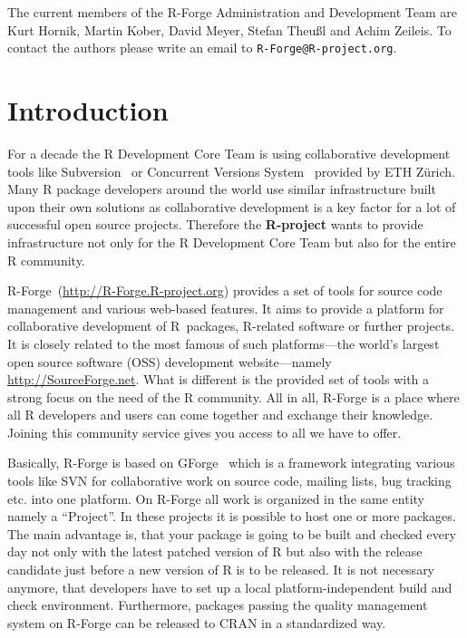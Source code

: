 \documentclass[a4paper]{article}
\newcommand{\RFORGE}{\proglang{R}-Forge Administration and Development Team}
\let\email=\texttt
\newcommand{\proglang}[1]{\textsf{#1}}
\begin{document}
\vspace{0.5cm}
The current members of the \RFORGE{} are Kurt Hornik, Martin Kober,
David Meyer, Stefan Theu\ss{}l and Achim Zeileis. To contact the
authors please write an email to \email{R-Forge@R-project.org}.

\newpage

\pagestyle{plain}
\tableofcontents

\clearpage
\pagestyle{headings}
\setcounter{page}{1}

\section{Introduction}
\label{sec:intro}

For a decade the \proglang{R} Development Core Team is using collaborative
development tools like Subversion~\citep[SVN,
see][]{forge:Pilato+Collins-Sussman+Fitzpatrick:2004} or Concurrent
Versions System~\citep[CVS, see][]{forge:Cederqvist:2006} provided by
ETH Z\"urich.   
Many \proglang{R} package
developers around the world use similar infrastructure built upon their own
solutions as collaborative development is a key factor for a lot of
successful open source projects. Therefore the \textbf{R-project}
wants to provide infrastructure not only
for the \proglang{R} Development Core Team but also for the entire
\proglang{R} community. 

R-Forge~(\url{http://R-Forge.R-project.org}) provides a set of tools
for source code management and various web-based
features. It aims to provide a platform for collaborative development of
\proglang{R}~packages, \proglang{R}-related software or further projects. It is
closely related to the most famous of such platforms---the 
world's largest open source software (OSS) development website---namely
\url{http://SourceForge.net}. What is different is the provided set of
tools with a strong focus on the need of the \proglang{R}
community. All in all, \proglang{R}-Forge is a place where all \proglang{R}
developers and users can come together and exchange 
their knowledge. Joining this community service gives you access to
all we have to offer. 

Basically, \proglang{R}-Forge is based on 
GForge~\citep{forge:copeland_et_al:2006} which is a framework
integrating various tools like 
SVN for collaborative work on source code, mailing lists, bug tracking
etc. into one platform. On \proglang{R}-Forge all work is organized in
the same entity namely a ``Project''. In these projects it is possible
to host one or more packages. The main advantage is, that your package
is going to be built and checked every day 
not only with the latest patched version of \proglang{R} but also with
the release candidate just before a new version of \proglang{R} is to be
released. It is not necessary anymore, that developers have to set up
a local platform-independent build and check environment. Furthermore,
packages passing the quality management system on \proglang{R}-Forge can be
released to CRAN in a standardized way.
\end{document}
